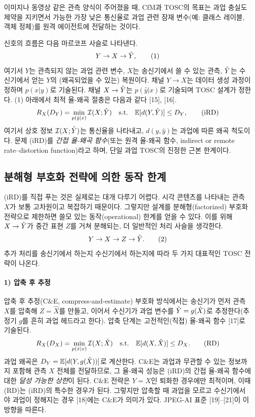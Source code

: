 이미지나 동영상 같은 관측 양식이 주어졌을 때, CfM과 TOSC의 목표는 과업 충실도 제약을 지키면서 가능한 가장 낮은 통신율로 과업 관련 잠재 변수(예: 클래스 레이블, 객체 정체)를 원격 에이전트에 전달하는 것이다.

신호의 흐름은 다음 마르코프 사슬로 나타낸다.
\begin{equation}
Y\to X\to \hat{Y},\tag{1}
\end{equation}
여기서 $Y$는 관측되지 않는 과업 관련 변수, $X$는 송신기에서 쓸 수 있는 관측, $\hat{Y}$는 수신기에서 얻는 $Y$의 (왜곡되었을 수 있는) 복원이다. 채널 $Y\to X$는 데이터 생성 과정이 정하며 $p(x|y)$로 기술된다. 채널 $X\to\hat{Y}$는 $p(\hat y|x)$로 기술되며 TOSC 설계가 정한다. (1) 아래에서 최적 율-왜곡 절충은 다음과 같다 [15], [16].
\begin{equation}
R_X(D_Y)=\min_{p(\hat y|x)}\mathcal{I}(X;\hat{Y})\quad\text{s.t.}\quad \mathbb{E}[d(Y,\hat{Y})]\le D_Y,\tag{iRD}
\end{equation}
여기서 상호 정보 $\mathcal{I}(X;\hat{Y})$는 통신율을 나타내고, $d(y,\hat y)$는 과업에 따른 왜곡 척도이다. 문제 (iRD)를 \emph{간접 율-왜곡 함수}(또는 원격 율-왜곡 함수, indirect or remote rate--distortion function)라고 하며, 단일 과업 TOSC의 진정한 근본 한계이다.

\subsection{분해형 부호화 전략에 의한 동작 한계}
(iRD)를 직접 푸는 것은 실제로는 대개 다루기 어렵다. 시각 콘텐츠를 나타내는 관측 $X$가 보통 고차원이고 복잡하기 때문이다. 그렇지만 설계를 분해형(factorized) 부호화 전략으로 제한하면 쓸모 있는 동작(operational) 한계를 얻을 수 있다. 이를 위해 $X\to\hat{Y}$가 중간 표현 $Z$를 거쳐 분해되는, 더 일반적인 처리 사슬을 생각한다.
\begin{equation}
Y\to X\to Z\to\hat{Y}.\tag{2}
\end{equation}
추가 처리를 송신기에서 하는지 수신기에서 하는지에 따라 두 가지 대표적인 TOSC 전략이 나온다.

\paragraph{1) 압축 후 추정}
압축 후 추정(C\&E, compress-and-estimate) 부호화 방식에서는 송신기가 먼저 관측 $X$를 압축해 $Z=\hat X$를 만들고, 이어서 수신기가 과업 변수를 $\hat{Y}=g(\hat X)$로 추정한다(추정기 $g$를 흔히 과업 헤드라고 한다). 압축 단계는 고전적인(직접) 율-왜곡 함수 [17]로 기술된다.
\begin{equation}
R_X(D_X)=\min_{p(\hat x|x)}\mathcal{I}(X;\hat X)\quad\text{s.t.}\quad \mathbb{E}[d(X,\hat X)]\le D_X.\tag{RD}
\end{equation}
과업 왜곡은 $D_Y=\mathbb{E}[d(Y,g(\hat X))]$로 계산한다. C\&E는 과업과 무관할 수 있는 정보까지 포함해 관측 $X$ 전체를 전달하므로, 그 율-왜곡 성능은 (iRD)의 간접 율-왜곡 함수에 대한 \emph{달성 가능한 상한}이 된다. C\&E 전략은 $Y=X$인 퇴화한 경우에만 최적이며, 이때 (RD)는 (iRD)의 특수한 경우가 된다. 그렇지만 압축할 때 과업을 모르고 수신기에서야 과업이 정해지는 경우 [18]에는 C\&E가 의미가 있다. JPEG-AI 표준 [19]--[21]이 이 방향을 따른다.

